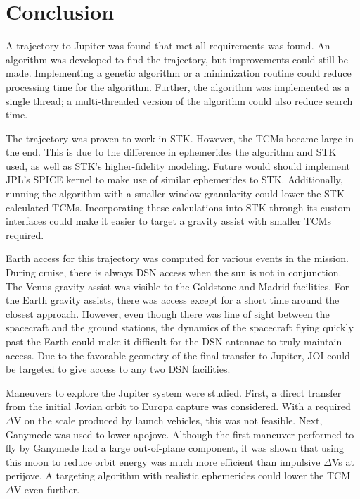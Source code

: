 \documentclass[]{aiaa-tc}%
\begin{document}
	\section{Conclusion}

	A trajectory to Jupiter was found that met all requirements was found. An algorithm was developed to find the trajectory, but improvements could still be made. Implementing a genetic algorithm or a minimization routine could reduce processing time for the algorithm. Further, the algorithm was implemented as a single thread; a multi-threaded version of the algorithm could also reduce search time.

	\vspace{5 mm}

The trajectory was proven to work in STK. However, the TCMs became large in the end. This is due to the difference in ephemerides the algorithm and STK used, as well as STK's higher-fidelity modeling. Future would should implement JPL's SPICE kernel to make use of similar ephemerides to STK. Additionally, running the algorithm with a smaller window granularity could lower the STK-calculated TCMs. Incorporating these calculations into STK through its custom interfaces could make it easier to target a gravity assist with smaller TCMs required.

	\vspace{5 mm}

Earth access for this trajectory was computed for various events in the mission. During cruise, there is always DSN access when the sun is not in conjunction. The Venus gravity assist was visible to the Goldstone and Madrid facilities. For the Earth gravity assists, there was access except for a short time around the closest approach. However, even though there was line of sight between the spacecraft and the ground stations, the dynamics of the spacecraft flying quickly past the Earth could make it difficult for the DSN antennae to truly maintain access.  Due to the favorable geometry of the final transfer to Jupiter, JOI could be targeted to give access to any two DSN facilities. 

	\vspace{5 mm}

Maneuvers to explore the Jupiter system were studied. First, a direct transfer from the initial Jovian orbit to Europa capture was considered. With a required $\Delta$V on the scale produced by launch vehicles, this was not feasible. Next, Ganymede was used to lower apojove. Although the first maneuver performed to fly by Ganymede had a large out-of-plane component, it was shown that using this moon to reduce orbit energy was much more efficient than impulsive $\Delta$Vs at perijove. A targeting algorithm with realistic ephemerides could lower the TCM $\Delta$V even further.
\end{document}
